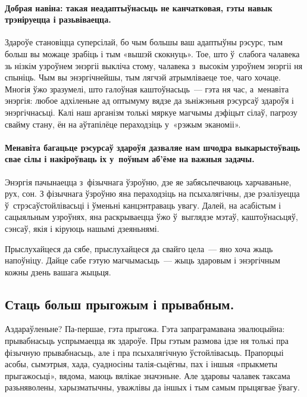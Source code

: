 \paragraph{Добрая навіна: такая неадаптыўнасьць не канчатковая, гэты навык трэніруецца і разьвіваецца.} Здароўе становіцца суперсілай, бо чым большы ваш адаптыўны рэсурс, тым больш вы можаце зрабіць і тым «вышэй скокнуць». Тое, што ў~слабога чалавека зь нізкім узроўнем энэргіі выкліча стому, чалавека з~высокім узроўнем энэргіі ня спыніць. Чым вы энэргічнейшы, тым лягчэй атрымліваеце тое, чаго хочаце. Многія ўжо зразумелі, што галоўная каштоўнасьць~--- гэта ня час, а~менавіта энэргія: любое адхіленьне ад оптымуму вядзе да зьніжэньня рэсурсаў здароўя і энэргічнасьці. Калі наш арганізм толькі мяркуе магчымы дэфіцыт сілаў, пагрозу свайму стану, ён на аўтапілёце пераходзіць у~«рэжым эканоміі».

\paragraph{Менавіта багацьце рэсурсаў здароўя дазваляе нам шчодра выкарыстоўваць свае сілы і накіроўваць іх у~поўным аб'ёме на важныя задачы.} Энэргія пачынаецца з~фізычнага ўзроўню, дзе яе забясьпечваюць харчаваньне, рух, сон. З фізычнага ўзроўню яна пераходзіць на псыхалягічны, дзе рэалізуецца ў~стрэсаўстойлівасьці і ўменьні канцэнтраваць увагу. Далей, на асабістым і сацыяльным узроўнях, яна раскрываецца ўжо ў~выглядзе мэтаў, каштоўнасьцяў, сэнсаў, якія і кіруюць нашымі дзеяньнямі.


Прыслухайцеся да сябе, прыслухайцеся да свайго цела~--- яно хоча жыць напоўніцу. Дайце сабе гэтую магчымасьць~--- жыць здаровым і энэргічным кожны дзень вашага жыцьця.

\subsection*{Стаць больш прыгожым і прывабным.}

Аздараўленьне? Па-першае, гэта прыгожа. Гэта запраграмавана эвалюцыйна: прывабнасьць успрымаецца як здароўе. Пры гэтым размова ідзе ня толькі пра фізычную прывабнасьць, але і пра псыхалягічную ўстойлівасьць. Прапорцыі асобы, сымэтрыя, хада, суадносіны талія-сьцёгны, пах і іншыя «прыкметы прыгажосьці», вядома, маюць вялікае значэньне. Але здаровы чалавек таксама разьняволены, харызматычны, уважлівы да іншых і тым самым прыцягвае ўвагу.

